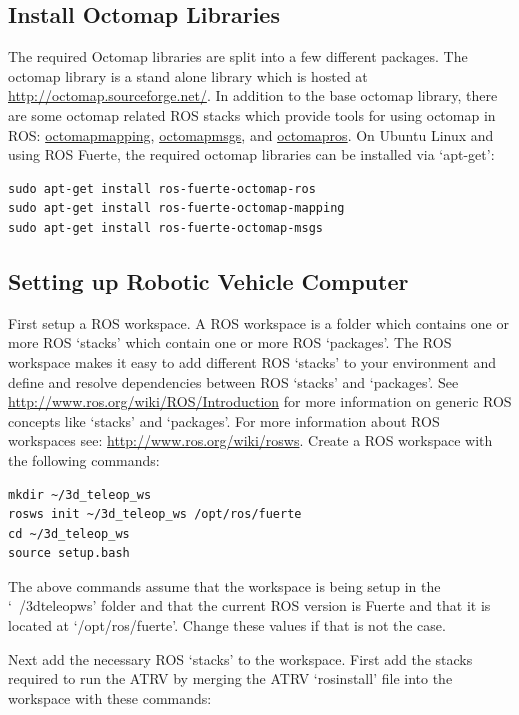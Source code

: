 \documentclass[12pt]{report}
\begin{document}
\subsection{Install Octomap Libraries}
The required Octomap libraries are split into a few different packages.  The octomap library is a stand alone library which is hosted at \url{http://octomap.sourceforge.net/}.  In addition to the base octomap library, there are some octomap related ROS stacks which provide tools for using octomap in ROS: \href{http://ros.org/wiki/octomap\textunderscore{}mapping}{octomap\textunderscore{}mapping}, \href{http://ros.org/wiki/octomap\textunderscore{}msgs}{octomap\textunderscore{}msgs}, and \href{http://ros.org/wiki/octomap\textunderscore{}ros}{octomap\textunderscore{}ros}.  On Ubuntu Linux and using ROS Fuerte, the required octomap libraries can be installed via `apt-get':

\begin{verbatim}
sudo apt-get install ros-fuerte-octomap-ros
sudo apt-get install ros-fuerte-octomap-mapping
sudo apt-get install ros-fuerte-octomap-msgs
\end{verbatim}

\subsection{Setting up Robotic Vehicle Computer}
First setup a ROS workspace.  A ROS workspace is a folder which contains one or more ROS `stacks' which contain one or more ROS `packages'.  The ROS workspace makes it easy to add different ROS `stacks' to your environment and define and resolve dependencies between ROS `stacks' and `packages'.  See \url{http://www.ros.org/wiki/ROS/Introduction} for more information on generic ROS concepts like `stacks' and `packages'.  For more information about ROS workspaces see: \url{http://www.ros.org/wiki/rosws}.  Create a ROS workspace with the following commands:

\begin{verbatim}
mkdir ~/3d_teleop_ws
rosws init ~/3d_teleop_ws /opt/ros/fuerte
cd ~/3d_teleop_ws
source setup.bash
\end{verbatim}

The above commands assume that the workspace is being setup in the `~/3d\textunderscore{}teleop\textunderscore{}ws' folder and that the current ROS version is Fuerte and that it is located at `/opt/ros/fuerte'.  Change these values if that is not the case.

Next add the necessary ROS `stacks' to the workspace.  First add the stacks required to run the ATRV by merging the ATRV `rosinstall' file into the workspace with these commands:
\end{document}
